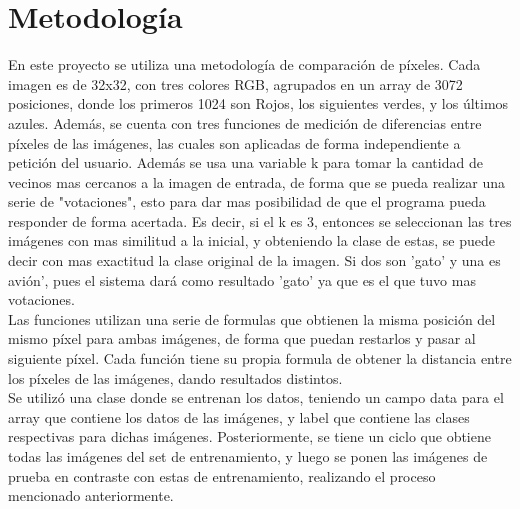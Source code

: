 \documentclass{article}
\begin{document}
\section{Metodología}
En este proyecto se utiliza una metodología de comparación de píxeles. Cada imagen es de 32x32, con tres colores RGB, agrupados en un array de 3072 posiciones, donde los primeros 1024 son Rojos, los siguientes verdes, y los últimos azules. Además, se cuenta con tres funciones de medición de diferencias entre píxeles de las imágenes, las cuales son aplicadas de forma independiente a petición del usuario. Además se usa una variable k para tomar la cantidad de vecinos mas cercanos a la imagen de entrada, de forma que se pueda realizar una serie de "votaciones", esto para dar mas posibilidad de que el programa pueda responder de forma acertada. Es decir, si el k es 3, entonces se seleccionan las tres imágenes con mas similitud a la inicial, y obteniendo la clase de estas, se puede decir con mas exactitud la clase original de la imagen. Si dos son 'gato' y una es avión', pues el sistema dará como resultado 'gato' ya que es el que tuvo mas votaciones. \\
Las funciones utilizan una serie de formulas que obtienen la misma posición del mismo píxel para ambas imágenes, de forma que puedan restarlos y pasar al siguiente píxel. Cada función tiene su propia formula de obtener la distancia entre los píxeles de las imágenes, dando resultados distintos.\\
Se utilizó una clase donde se entrenan los datos, teniendo un campo data para el array que contiene los datos de las imágenes, y label que contiene las clases respectivas para dichas imágenes. Posteriormente, se tiene un ciclo que obtiene todas las imágenes del set de entrenamiento, y luego se ponen las imágenes de prueba en contraste con estas de entrenamiento, realizando el proceso mencionado anteriormente.
\end{document}

